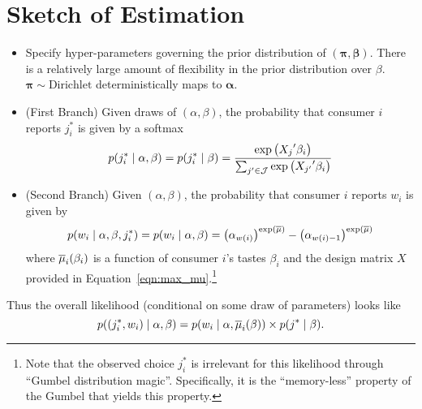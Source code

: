\documentclass{article}
\begin{document}
\section{Sketch of Estimation}
\begin{itemize}
    \item Specify hyper-parameters governing the prior distribution of $\left(\symbf{\pi}, \symbf{\beta}\right)$. There is a relatively large amount of flexibility in the prior distribution over $\beta$. $\symbf{\pi} \sim \text{Dirichlet}$ deterministically maps to $\symbf{\alpha}$.
    \item (First Branch) Given draws of $\left(\alpha, \beta\right)$, the probability that consumer $i$ reports $j^*_i$ is given by a softmax
    \begin{equation}
        p\mleft(j^*_i \mid \alpha, \beta\mright) = p\mleft(j^*_i \mid \beta\mright) = \frac{\exp\left({X_j}'\beta_i\right)}{\sum_{j'\in\mathcal{J}}\exp\left({X_{j'}}'\beta_i\right)}
    \end{equation}
    \item (Second Branch) Given $\left(\alpha, \beta\right)$, the probability that consumer $i$ reports $w_i$ is given by
    \begin{equation}
        p\mleft(w_i \mid \alpha,\beta, j^*_i\mright) = p\mleft(w_i\mid \alpha, \beta\mright) =  \left({\alpha_{w\mleft(i\mright)}}\right)^{\exp\left(\overline{\mu}\right)} - \left({\alpha_{w\mleft(i\mright)-1}}\right)^{\exp\left(\overline{\mu}\right)}
    \end{equation}
    where $\overline{\mu}_i\mleft(\beta_i\mright)$ is a function of consumer $i$'s tastes $\beta_i$ and the design matrix $X$ provided in Equation~\ref{eqn:max_mu}.\footnote{Note that the observed choice $j^*_i$ is irrelevant for this likelihood through ``Gumbel distribution magic''. Specifically, it is the ``memory-less'' property of the Gumbel that yields this property.}
\end{itemize}

Thus the overall likelihood (conditional on some draw of parameters) looks like
\begin{equation}
    p\mleft(\left(j^*_i, w_i\right) \mid \alpha, \beta \mright) = p\mleft(w_i \mid \alpha,\overline{\mu}_i\mleft(\beta\mright) \mright) \times p\mleft(j^* \mid \beta\mright).
\end{equation}
\end{document}
